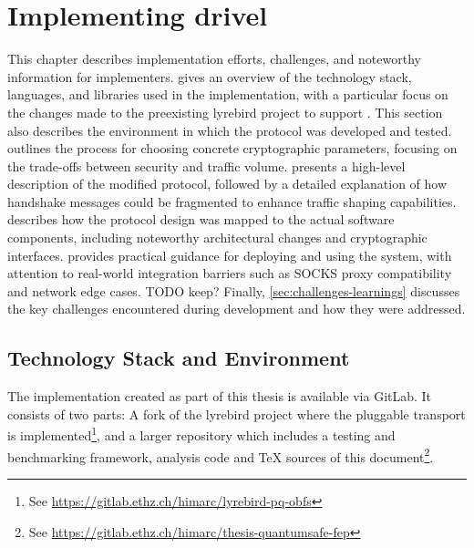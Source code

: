 \chapter{Implementing drivel}\label{ch:implementation}

This chapter describes implementation efforts, challenges, and noteworthy information for implementers.
 gives an overview of the technology stack, languages, and libraries used in the implementation, with a particular focus on the changes made to the preexisting lyrebird project \cite{lyrebird} to support \drivel{}. This section also describes the environment in which the protocol was developed and tested.
 outlines the process for choosing concrete cryptographic parameters, focusing on the trade-offs between security and traffic volume.
 presents a high-level description of the modified \drivel{} protocol, followed by a detailed explanation of how handshake messages could be fragmented to enhance traffic shaping capabilities.
 describes how the protocol design was mapped to the actual software components, including noteworthy architectural changes and cryptographic interfaces.
 provides practical guidance for deploying and using the system, with attention to real-world integration barriers such as SOCKS proxy compatibility and network edge cases. TODO keep?
Finally, \cref{sec:challenges-learnings} discusses the key challenges encountered during development and how they were addressed.



\section{Technology Stack and Environment} \label{sec:tech-stack}

The implementation created as part of this thesis is available via GitLab. It consists of two parts: A fork of the lyrebird project \cite{lyrebird} where the \drivel{} pluggable transport is implemented\footnote{See \url{https://gitlab.ethz.ch/himarc/lyrebird-pq-obfs}}, and a larger repository which includes a testing and benchmarking framework, analysis code and TeX sources of this document\footnote{See \url{https://gitlab.ethz.ch/himarc/thesis-quantumsafe-fep}}.

